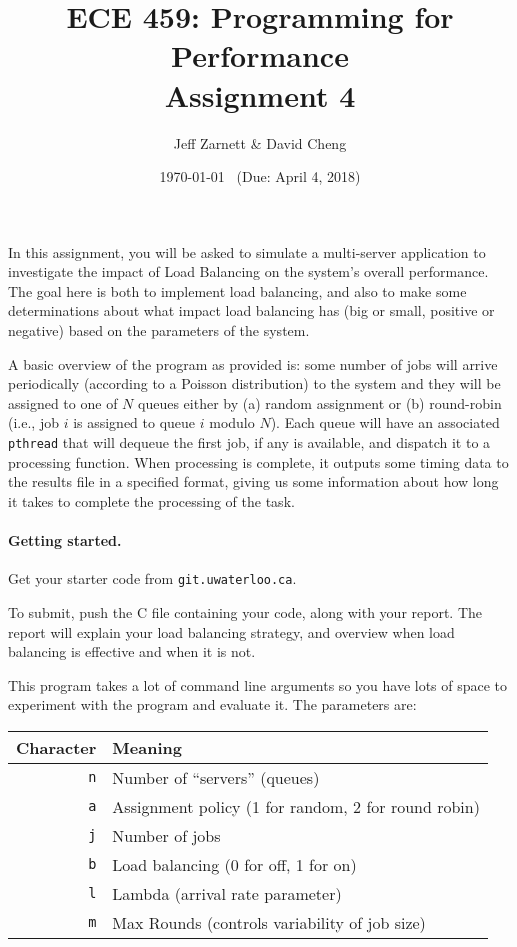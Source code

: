 \documentclass[letterpaper,10pt]{article}
\title{\bf ECE 459: Programming for Performance\\Assignment 4}
\author{Jeff Zarnett \& David Cheng}
\date{\today ~ (Due: April 4, 2018)}
\begin{document}
\maketitle

In this assignment, you will be asked to simulate a multi-server application to investigate the impact of Load Balancing on the system's overall performance. The goal here is both to implement load balancing, and also to make some determinations about what impact load balancing has (big or small, positive or negative) based on the parameters of the system. 

A basic overview of the program as provided is: some number of jobs will arrive periodically (according to a Poisson distribution) to the system and they will be assigned to one of $N$ queues either by (a) random assignment or (b) round-robin (i.e., job $i$ is assigned to queue $i$ modulo $N$). Each queue will have an associated \texttt{pthread} that will dequeue the first job, if any is available, and dispatch it to a processing function. When processing is complete, it outputs some timing data to the results file in a specified format, giving us some information about how long it takes to complete the processing of the task.


\paragraph{Getting started.} Get your starter code from \texttt{git.uwaterloo.ca}.

To submit, push the C file containing your code, along with your report. The report will explain your load balancing strategy, and overview when load balancing is effective and when it is not.

This program takes a lot of command line arguments so you have lots of space to experiment with the program and evaluate it. The parameters are:

\begin{center}
	\begin{tabular}{r|l}
	\textbf{Character} & \textbf{Meaning} \\ \hline
	\texttt{n} & Number of ``servers'' (queues) \\
	\texttt{a} & Assignment policy (1 for random, 2 for round robin) \\
	\texttt{j} & Number of jobs \\
	\texttt{b} & Load balancing (0 for off, 1 for on) \\
	\texttt{l} & Lambda (arrival rate parameter) \\
	\texttt{m} & Max Rounds (controls variability of job size) \\
	\end{tabular}
\end{center}
\end{document}
